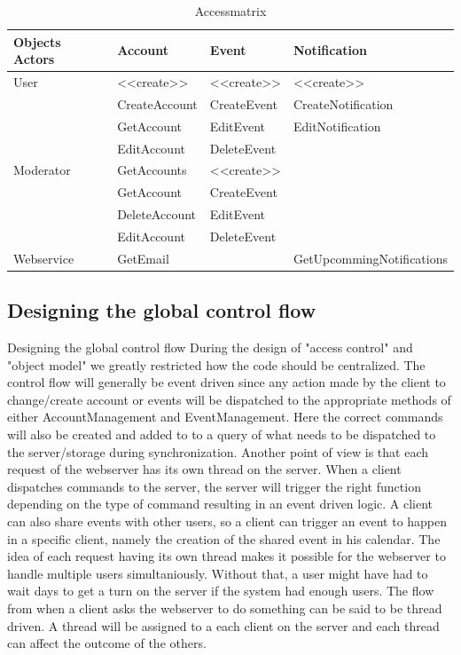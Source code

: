 \documentclass[a4paper]{article}
\begin{document}
\begin{table}
\centering

\begin{tabular}{l | l | l | l}
	\hline
	Objects Actors	&Account 	&Event 			&Notification\\
	\hline
	User		&<<create>>		&<<create>>		&<<create>>\\
    			&CreateAccount	&CreateEvent	&CreateNotification\\
                &GetAccount		&EditEvent		&EditNotification\\
                &EditAccount	&DeleteEvent	&\\
    \hline
	Moderator 	&GetAccounts	&<<create>>		&\\
    			&GetAccount		&CreateEvent	&\\
                &DeleteAccount	&EditEvent		&\\
                &EditAccount	&DeleteEvent	&\\
	\hline
	Webservice	&GetEmail		& 				&GetUpcommingNotifications\\
	\hline
\end{tabular}

\caption{Accessmatrix}
\label{tab:ObjectsActors}

\end{table}

\subsection{Designing the global control flow}

Designing the global control flow
During the design of "access control" and "object model" we greatly restricted how the code should be centralized. The control flow will generally be event driven since any action made by the client to change/create account or events will be dispatched to the appropriate methods of either AccountManagement and EventManagement. Here the correct commands will also be created and added to to a query of what needs to be dispatched to the server/storage during synchronization.
Another point of view is that each request of the webserver has its own thread on the server. When a client dispatches commands to the server, the server will trigger the right function depending on the type of command resulting in an event driven logic. A client can also share events with other users, so a client can trigger an event to happen in a specific client, namely the creation of the shared event in his calendar.  The idea of each request having its own thread makes it possible for the webserver to handle multiple users simultaniously. Without that, a user might have had to wait days to get a turn on the server if the system had enough users. The flow from when a client asks the webserver to do something can be said to be thread driven. A thread will be assigned to a each client on the server and each thread can affect the outcome of the others.
\end{document}
